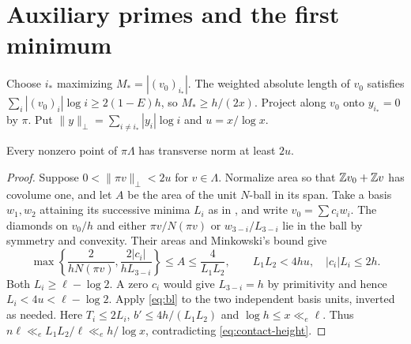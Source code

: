 \section{Auxiliary primes and the first minimum}\label{sec:aux}

Choose $i_*$ maximizing $M_*=|(v_0)_{i_*}|$.
The weighted absolute length of $v_0$ satisfies
$\sum_i|(v_0)_i|\log i\ge2(1-E)h$, so $M_*\ge h/(2x)$.
Project along $v_0$ onto $y_{i_*}=0$ by $\pi$.
Put $\|y\|_\perp=\sum_{i\ne i_*}|y_i|\log i$ and $u=x/\log x$.

\begin{lemma}\label{lem:separation}
Every nonzero point of $\pi\Lambda$ has transverse norm at least $2u$.
\end{lemma}
\begin{proof}
Suppose $0<\|\pi v\|_\perp<2u$ for $v\in\Lambda$.
Normalize area so that $\mathbb Z v_0+\mathbb Z v$ has covolume one, and let $A$ be the
area of the unit $N$-ball in its span. Take a basis $w_1,w_2$ attaining its successive minima
$L_i$ as in \cite[proof of Proposition~6.1]{Z29}, and write $v_0=\sum c_iw_i$.
The diamonds on $v_0/h$ and either $\pi v/N(\pi v)$ or $w_{3-i}/L_{3-i}$
lie in the ball by symmetry and convexity. Their areas and Minkowski's bound give
\[
 \max\left\{\frac{2}{hN(\pi v)},\frac{2|c_i|}{hL_{3-i}}\right\}
 \le A\le\frac4{L_1L_2},\qquad L_1L_2<4hu,\quad |c_i|L_i\le2h .
\]
Both $L_i\ge\ell-\log2$. A zero $c_i$ would give $L_{3-i}=h$ by primitivity
and hence $L_i<4u<\ell-\log2$.
Apply \eqref{eq:bl} to the two independent basis units, inverted as needed.
Here $T_i\le2L_i$, $b'\le4h/(L_1L_2)$ and $\log h\le x\ll_e\ell$.
Thus $n\ell\ll_e L_1L_2/\ell\ll_e h/\log x$, contradicting \eqref{eq:contact-height}.
\end{proof}

